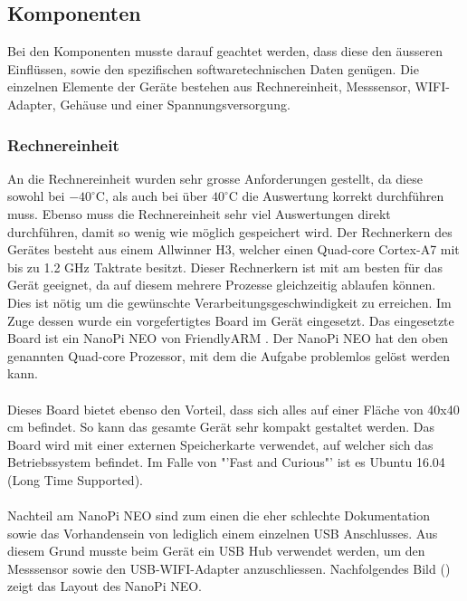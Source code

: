 \subsection{Komponenten}
Bei den Komponenten musste darauf geachtet werden, dass diese den äusseren Einflüssen, sowie den spezifischen softwaretechnischen Daten genügen. Die einzelnen Elemente der Geräte bestehen aus Rechnereinheit, Messsensor, WIFI-Adapter, Gehäuse und einer Spannungsversorgung.

\subsubsection{Rechnereinheit}
An die Rechnereinheit wurden sehr grosse Anforderungen gestellt, da diese sowohl bei $-40^\circ\text{C}$, als auch bei über $40^\circ\text{C}$ die Auswertung korrekt durchführen muss. Ebenso muss die Rechnereinheit sehr viel Auswertungen direkt durchführen, damit so wenig wie möglich gespeichert wird. Der Rechnerkern des Gerätes besteht aus einem Allwinner H3, welcher einen Quad-core Cortex-A7 mit bis zu 1.2 GHz Taktrate besitzt. Dieser Rechnerkern ist mit am besten für das Gerät geeignet, da auf diesem mehrere Prozesse gleichzeitig ablaufen können. Dies ist nötig um die gewünschte Verarbeitungsgeschwindigkeit zu erreichen. Im Zuge dessen wurde ein vorgefertigtes Board im Gerät eingesetzt. Das eingesetzte Board ist ein NanoPi NEO von FriendlyARM \cite{NanoPi}. Der NanoPi NEO hat den oben genannten Quad-core Prozessor, mit dem die Aufgabe problemlos gelöst werden kann. \\\\
Dieses Board bietet ebenso den Vorteil, dass sich alles auf einer Fläche von 40x40 cm befindet. So kann das gesamte Gerät sehr kompakt gestaltet werden. Das Board wird mit einer externen Speicherkarte verwendet, auf welcher sich das Betriebssystem befindet. Im Falle von "'Fast and Curious"' ist es Ubuntu 16.04 (Long Time Supported). \\\\
Nachteil am NanoPi NEO sind zum einen die eher schlechte Dokumentation sowie das Vorhandensein von lediglich einem einzelnen USB Anschlusses. Aus diesem Grund musste beim Gerät ein USB Hub verwendet werden, um den Messsensor sowie den USB-WIFI-Adapter anzuschliessen. Nachfolgendes Bild () zeigt das Layout des NanoPi NEO.

